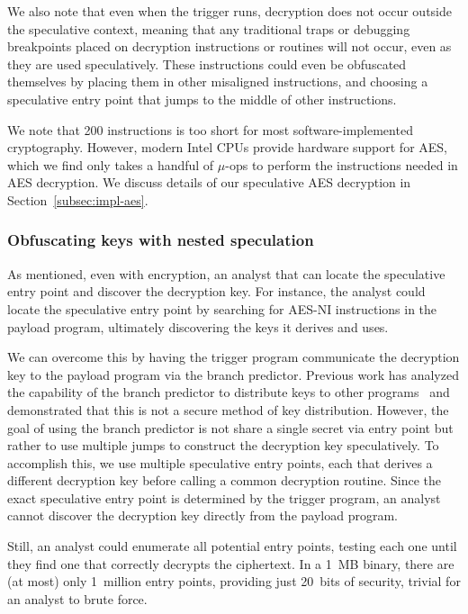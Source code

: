 We also note that even when the trigger runs, decryption does not occur outside
the speculative context, meaning that any traditional traps or debugging
breakpoints placed on decryption instructions or routines will not occur, even
as they are used speculatively. These instructions could even be obfuscated themselves by
placing them in other misaligned instructions, and choosing a speculative entry
point that jumps to the middle of other instructions.


We note that 200 instructions is too short for most software-implemented
cryptography. However, modern Intel CPUs provide hardware support for AES, which
we find only takes a handful of $\mu$-ops to perform the instructions needed in
AES decryption. We discuss details of our speculative AES decryption in
Section~\ref{subsec:impl-aes}.


\subsubsection{Obfuscating keys with nested speculation}
\label{subsec:nested-spec}

As mentioned, even with encryption, an analyst that can locate the
speculative entry point and discover the decryption key. For instance, the
analyst could locate the speculative entry point by searching for AES-NI
instructions in the payload program, ultimately discovering the keys it derives
and uses.

We can overcome this by having the trigger program communicate the decryption
key to the payload program via the branch predictor. Previous work has analyzed
the capability of the branch predictor to distribute keys to other
programs~\cite{evtyushkin2016jump, lee2017inferring, aciiccmez2007predicting}
and demonstrated that this is not a secure method of key distribution. However,
the goal of using the branch predictor is not share a single secret via entry
point but rather to use multiple jumps to construct the decryption key
speculatively. To accomplish this, we use multiple speculative entry points,
each that derives a different decryption key before calling a common decryption
routine. Since the exact speculative entry point is determined by the trigger
program, an analyst cannot discover the decryption key directly from the payload
program. 

Still, an analyst could enumerate all potential entry points, testing each one
until they find one that correctly decrypts the ciphertext. In a 1~MB binary,
there are (at most) only 1~million entry points, providing just 20~bits of
security, trivial for an analyst to brute force.

